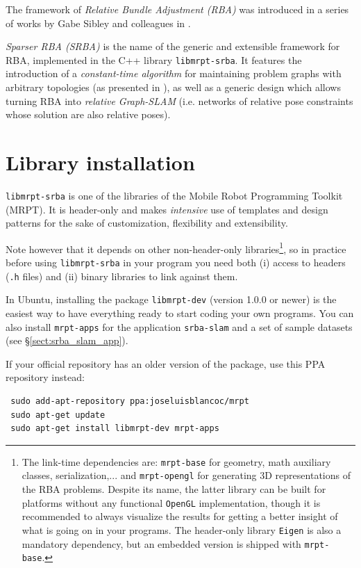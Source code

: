 \documentclass[a4paper,11pt]{article}
\begin{document}
The framework of \emph{Relative Bundle Adjustment (RBA)} was introduced in a series of works by Gabe Sibley and 
colleagues in \cite{sibley2009rba,sibley2009adaptive}. 

\emph{Sparser RBA (SRBA)} is the name of the generic and extensible framework for RBA, implemented in 
the C++ library \texttt{libmrpt-srba}. It features the introduction of 
a \emph{constant-time algorithm} for maintaining problem graphs with arbitrary topologies 
(as presented in \cite{blanco2013srba}), as well as a generic design which allows turning RBA 
into \emph{relative Graph-SLAM} (i.e. networks of relative pose constraints whose solution are also relative poses).

\section{Library installation}

\texttt{libmrpt-srba} is one of the libraries of the Mobile Robot Programming Toolkit (MRPT). 
It is header-only and makes \emph{intensive} use of templates and design patterns for the sake of customization, 
flexibility and extensibility. 

Note however that it depends on other non-header-only libraries\footnote{The link-time dependencies are: \texttt{mrpt-base} 
for geometry, math auxiliary classes, serialization,... and \texttt{mrpt-opengl} for generating 3D representations of 
the RBA problems. Despite its name, the latter library can be built for platforms without any 
functional \texttt{OpenGL} implementation, though it is recommended to always visualize the results for getting a better 
insight of what is going on in your programs. The header-only library \texttt{Eigen} \cite{eigenweb} is also a mandatory dependency, but 
an embedded version is shipped with \texttt{mrpt-base}.}, 
so in practice before using \texttt{libmrpt-srba} in your program you need
both (i) access to headers (\texttt{.h} files) and (ii) binary libraries to link against them. 

In Ubuntu, installing the package \texttt{libmrpt-dev} (version 1.0.0 or newer) is the easiest way to have 
everything ready to start coding your own programs. You can also install \texttt{mrpt-apps} for the application \texttt{srba-slam} 
and a set of sample datasets (see \S\ref{sect:srba_slam_app}).

If your official repository has an older version of the package, use this PPA repository instead:

\begin{lstlisting}
 sudo add-apt-repository ppa:joseluisblancoc/mrpt
 sudo apt-get update
 sudo apt-get install libmrpt-dev mrpt-apps
\end{lstlisting}
\end{document}
